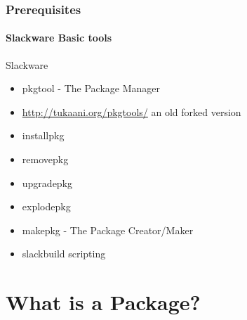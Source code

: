 \documentclass[1pt,hyperref={pdfpagelabels=true}]{beamer}
\begin{document}
\begin{frame}
  \frametitle{Prerequisites}
  \framesubtitle{Slackware Basic tools}
  
  \begin{block}{Slackware}
    \begin{itemize}[<+-| alert@+>]
    \item<1-7> pkgtool - The Package Manager
    \item<2>  \url{http://tukaani.org/pkgtools/} an old forked version
    \item<3-7> installpkg
    \item<4-7> removepkg
    \item<5-7> upgradepkg
    \item<6-7> explodepkg
    \item<7-7> makepkg - The Package Creator/Maker
    \item<8-> slackbuild scripting
    \end{itemize}
  \end{block}
  
\end{frame}

\section{What is a Package?}
\end{document}
